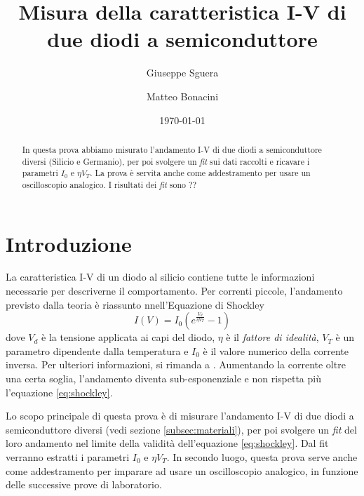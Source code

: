 \documentclass[11pt, a4paper, twoside]{article}
\author{Giuseppe Sguera \\ \getenv{MAT1} \and Matteo Bonacini \\ \getenv{MAT2}}
\date{\today}
\title{Misura della caratteristica I-V di due diodi a semiconduttore}
\begin{document}

    \maketitle

    \begin{abstract}\label{sec:abstract}
      In questa prova abbiamo misurato l'andamento I-V di due diodi a semiconduttore diversi (Silicio e Germanio), per poi svolgere un \emph{fit}
      sui dati raccolti e ricavare i parametri $I_0$ e $\eta V_T$. La prova è servita anche come addestramento per usare
      un oscilloscopio analogico. I risultati dei \emph{fit} sono ?? %
    \end{abstract}

\section{Introduzione}\label{sec:scopo}
  La caratteristica I-V di un diodo al silicio contiene tutte le informazioni necessarie per descriverne il comportamento.
  Per correnti piccole, l'andamento previsto dalla teoria è riassunto nnell'Equazione di Shockley
  \begin{equation}
    I(V) = I_0 \left(
      e^{
        \frac {V_d} {\eta V_T}
      } - 1
    \right)
    \label{eq:shockley}
  \end{equation}
  dove $V_d$ è la tensione applicata ai capi del diodo, $\eta$ è il \emph{fattore di idealità}, $V_T$ è un parametro dipendente dalla
  temperatura e $I_0$ è il valore numerico della corrente inversa. Per ulteriori informazioni, si rimanda a \cite{halkias2001integrated}.
  Aumentando la corrente oltre una certa soglia, l'andamento diventa sub-esponenziale e non rispetta più l'equazione \eqref{eq:shockley}.

  Lo scopo principale di questa prova è di misurare l'andamento I-V di due diodi a semiconduttore diversi (vedi sezione \ref{subsec:materiali}), per poi svolgere un
  \emph{fit} del loro andamento nel limite della validità dell'equazione \eqref{eq:shockley}. Dal fit verranno estratti i parametri $I_0$ e $\eta V_T$. 
  In secondo luogo, questa prova serve anche come addestramento per imparare ad usare un oscilloscopio analogico, in funzione delle successive
  prove di laboratorio.
\end{document}
